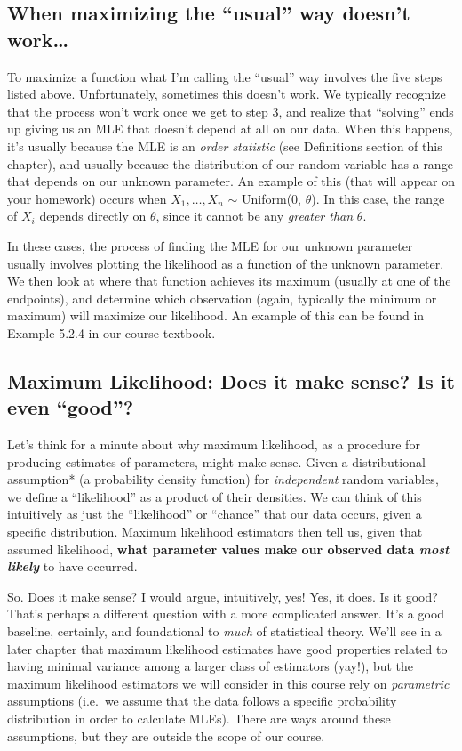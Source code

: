 \documentclass[
  letterpaper,
  DIV=11,
  numbers=noendperiod]{scrreprt}
\begin{document}
\subsection*{When maximizing the ``usual'' way doesn't
work\ldots{}}\label{when-maximizing-the-usual-way-doesnt-work}

To maximize a function what I'm calling the ``usual'' way involves the
five steps listed above. Unfortunately, sometimes this doesn't work. We
typically recognize that the process won't work once we get to step 3,
and realize that ``solving'' ends up giving us an MLE that doesn't
depend at all on our data. When this happens, it's usually because the
MLE is an \emph{order statistic} (see Definitions section of this
chapter), and usually because the distribution of our random variable
has a range that depends on our unknown parameter. An example of this
(that will appear on your homework) occurs when \(X_1, \dots, X_n\)
\(\sim\) Uniform(0, \(\theta\)). In this case, the range of \(X_i\)
depends directly on \(\theta\), since it cannot be any \emph{greater
than} \(\theta\).

In these cases, the process of finding the MLE for our unknown parameter
usually involves plotting the likelihood as a function of the unknown
parameter. We then look at where that function achieves its maximum
(usually at one of the endpoints), and determine which observation
(again, typically the minimum or maximum) will maximize our likelihood.
An example of this can be found in Example 5.2.4 in our course textbook.

\subsection*{Maximum Likelihood: Does it make sense? Is it even
``good''?}\label{maximum-likelihood-does-it-make-sense-is-it-even-good}

Let's think for a minute about why maximum likelihood, as a procedure
for producing estimates of parameters, might make sense. Given a
distributional assumption* (a probability density function) for
\emph{independent} random variables, we define a ``likelihood'' as a
product of their densities. We can think of this intuitively as just the
``likelihood'' or ``chance'' that our data occurs, given a specific
distribution. Maximum likelihood estimators then tell us, given that
assumed likelihood, \textbf{what parameter values make our observed data
\emph{most likely}} to have occurred.

So. Does it make sense? I would argue, intuitively, yes! Yes, it does.
Is it good? That's perhaps a different question with a more complicated
answer. It's a good baseline, certainly, and foundational to \emph{much}
of statistical theory. We'll see in a later chapter that maximum
likelihood estimates have good properties related to having minimal
variance among a larger class of estimators (yay!), but the maximum
likelihood estimators we will consider in this course rely on
\emph{parametric} assumptions (i.e.~we assume that the data follows a
specific probability distribution in order to calculate MLEs). There are
ways around these assumptions, but they are outside the scope of our
course.
\end{document}
